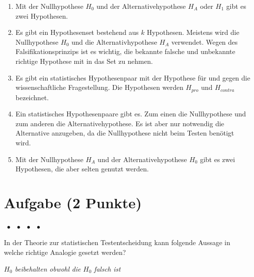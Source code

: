 \documentclass[a4paper, 9pt]{scrartcl}\usepackage[]{graphicx}\usepackage[]{xcolor}
\begin{document}
\begin{enumerate}
\item [\textbf{A} \msquare] Mit der Nullhypothese $H_0$ und der Alternativehypothese $H_A$ oder $H_1$ gibt es zwei Hypothesen.
\item [\textbf{B} \msquare] Es gibt ein Hypothesenset bestehend aus $k$ Hypothesen. Meistens wird die Nullhypothese $H_0$ und die Alternativhypothese $H_A$ verwendet. Wegen des Falsifikationsprinzips ist es wichtig, die bekannte falsche und unbekannte richtige Hypothese mit in das Set zu nehmen.
\item [\textbf{C} \msquare] Es gibt ein statistisches Hypothesenpaar mit der Hypothese für und gegen die wissenschaftliche Fragestellung. Die Hypothesen werden $H_{pro}$ und $H_{contra}$ bezeichnet.
\item [\textbf{D} \msquare] Ein statistisches Hypothesenpaare gibt es. Zum einen die Nullhypothese und zum anderen die Alternativehypothese. Es ist aber nur notwendig die Alternative anzugeben, da die Nullhypothese nicht beim Testen benötigt wird.
\item [\textbf{E} \msquare] Mit der Nullhypothese $H_A$ und der Alternativehypothese $H_0$ gibt es zwei Hypothesen, die aber selten genutzt werden.
\end{enumerate}

\section{Aufgabe \hfill (2 Punkte)}

\ifcollection
\begin{flushright}
\tiny\vspace{-2Ex}
\textbf{\examinhaltstart}
\exammodulemathstat $\;\bullet$
\exammodulestat $\;\bullet$
\exammodulestatbbv $\;\bullet$
\exammodulestatversuch $\;\bullet$
\exammodulebiostat
\vspace{-1Ex}
\end{flushright}
\fi




In der Theorie zur statistischen Testentscheidung kann folgende Aussage
in welche richtige Analogie gesetzt werden?

\begin{center}
\textit{$H_0$ beibehalten obwohl die $H_0$ falsch ist}
\end{center}
\end{document}
